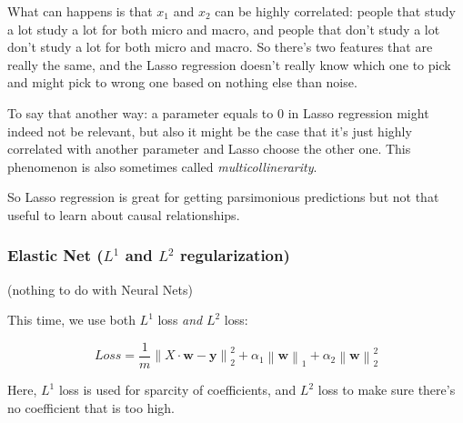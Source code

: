 \documentclass{article}
\theoremstyle{problemstyle}
\begin{document}
What can happens is that $x_1$ and $x_2$ can be highly correlated: people that study a lot study a lot for both micro and macro, and people that don't study a lot don't study a lot for both micro and macro. So there's two features that are really the same, and the Lasso regression doesn't really know which one to pick and might pick to wrong one based on nothing else than noise. 

To say that another way: a parameter equals to 0 in Lasso regression might indeed not be relevant, but also it might be the case that it's just highly correlated with another parameter and Lasso choose the other one. This phenomenon is also sometimes called \emph{multicollinerarity}.

So Lasso regression is great for getting parsimonious predictions but not that useful to learn about causal relationships. 

\subsubsection{Elastic Net ($L^1$ and $L^2$ regularization)}

(nothing to do with Neural Nets)

This time, we use both $L^1$ loss \emph{and} $L^2$ loss: 

\[
  Loss = \frac{1}{m} \left\lVert X \cdot \textbf{w} - \textbf{y} \right\rVert_2 ^{2} + \alpha_1 \left\lVert \textbf{w} \right\rVert_1 + \alpha_2 \left\lVert \textbf{w} \right\rVert_2 ^{2}
\]

Here, $L^1$ loss is used for sparcity of coefficients, and $L^2$ loss to make sure there's no coefficient that is too high. 
\end{document}
